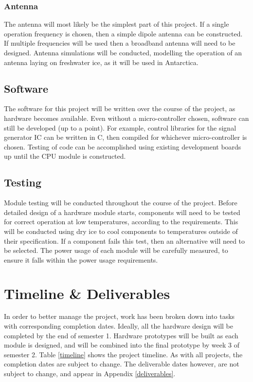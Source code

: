 \documentclass[a4paper,12pt]{article}
\begin{document}
\subsubsection{Antenna}
The antenna will most likely be the simplest part of this project. If a single operation frequency is chosen, then a simple dipole antenna can be constructed. If multiple frequencies will be used then a broadband antenna will need to be designed. Antenna simulations will be conducted, modelling the operation of an antenna laying on freshwater ice, as it will be used in Antarctica.

\subsection{Software}
The software for this project will be written over the course of the project, as hardware becomes available. Even without a micro-controller chosen, software can still be developed (up to a point). For example, control libraries for the signal generator IC can be written in C, then compiled for whichever micro-controller is chosen. Testing of code can be accomplished using existing development boards up until the CPU module is constructed.

\subsection{Testing}
Module testing will be conducted throughout the course of the project. Before detailed design of a hardware module starts, components will need to be tested for correct operation at low temperatures, according to the requirements. This will be conducted using dry ice to cool components to temperatures outside of their specification. If a component fails this test, then an alternative will need to be selected. The power usage of each module will be carefully measured, to ensure it falls within the power usage requirements.

\section{Timeline \& Deliverables}
In order to better manage the project, work has been broken down into tasks with corresponding completion dates. Ideally, all the hardware design will be completed by the end of semester 1. Hardware prototypes will be built as each module is designed, and will be combined into the final prototype by week 3 of semester 2.
Table \ref{timeline} shows the project timeline. As with all projects, the completion dates are subject to change. The deliverable dates however, are not subject to change, and appear in Appendix \ref{deliverables}.
\end{document}
